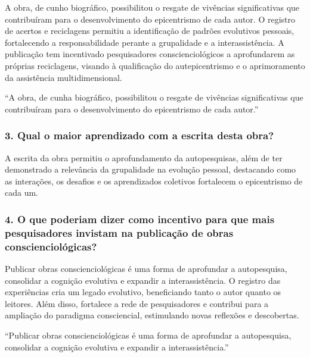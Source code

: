 \documentclass{gescons}
\begin{document}
\begin{multicols}{2}
A obra, de cunho biográfico, possibilitou o resgate de vivências significativas que contribuíram para o desenvolvimento do epicentrismo de cada autor. O registro de acertos e reciclagens permitiu a identificação de padrões evolutivos pessoais, fortalecendo a responsabilidade perante a grupalidade e a interassistência. A publicação tem incentivado pesquisadores conscienciológicos a aprofundarem as próprias reciclagens, visando à qualificação do autepicentrismo e o aprimoramento da assistência multidimensional.  

\begin{pullquote}
``A obra, de cunha biográfico, possibilitou o resgate de vivências significativas que contribuíram para o desenvolvimento do epicentrismo de cada autor.''
\end{pullquote}


\subsubsection{3. Qual o maior aprendizado com a escrita desta obra?}

A escrita da obra permitiu o aprofundamento da autopesquisas, além de ter demonstrado a relevância da grupalidade na evolução pessoal, destacando como as interações, os desafios e os aprendizados coletivos fortalecem o epicentrismo de cada um. 


\subsubsection{4. O que poderiam dizer como incentivo para que mais pesquisadores invistam na publicação de obras conscienciológicas?}

Publicar obras conscienciológicas é uma forma de aprofundar a autopesquisa, consolidar a cognição evolutiva e expandir a interassistência. O registro das experiências cria um legado evolutivo, beneficiando tanto o autor quanto os leitores. Além disso, fortalece a rede de pesquisadores e contribui para a ampliação do paradigma consciencial, estimulando novas reflexões e descobertas.


\begin{pullquote}
``Publicar obras conscienciológicas é uma forma de aprofundar a autopesquisa, consolidar a cognição evolutiva e expandir a interassistência.''
\end{pullquote}




    \end{multicols}
\end{document}
